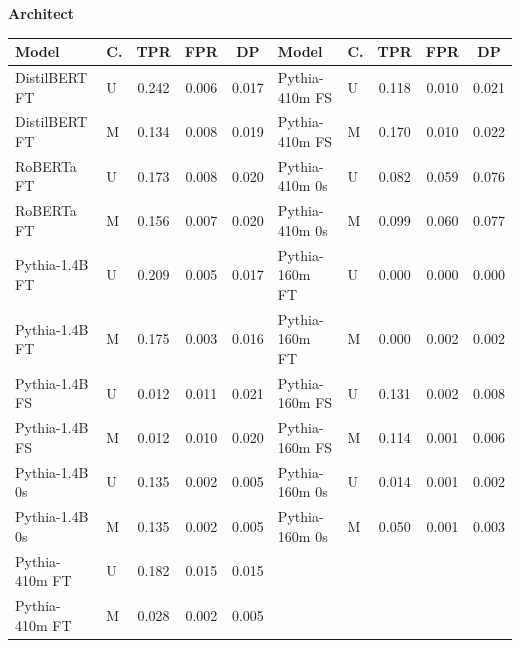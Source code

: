 \documentclass[11pt]{article}
\begin{document}
\vspace{4pt}\noindent\textbf{Architect}
\begin{center}\scriptsize
\begin{tabular}{llccc|llccc}
\toprule
\textbf{Model} & \textbf{C.} & \textbf{TPR} & \textbf{FPR} & \textbf{DP} & \textbf{Model} & \textbf{C.} & \textbf{TPR} & \textbf{FPR} & \textbf{DP} \\
\midrule
DistilBERT FT & U & 0.242 & 0.006 & 0.017 & Pythia-410m FS & U & 0.118 & 0.010 & 0.021 \\
DistilBERT FT & M & 0.134 & 0.008 & 0.019 & Pythia-410m FS & M & 0.170 & 0.010 & 0.022 \\
RoBERTa FT & U & 0.173 & 0.008 & 0.020 & Pythia-410m 0s & U & 0.082 & 0.059 & 0.076 \\
RoBERTa FT & M & 0.156 & 0.007 & 0.020 & Pythia-410m 0s & M & 0.099 & 0.060 & 0.077 \\
Pythia-1.4B FT & U & 0.209 & 0.005 & 0.017 & Pythia-160m FT & U & 0.000 & 0.000 & 0.000 \\
Pythia-1.4B FT & M & 0.175 & 0.003 & 0.016 & Pythia-160m FT & M & 0.000 & 0.002 & 0.002 \\
Pythia-1.4B FS & U & 0.012 & 0.011 & 0.021 & Pythia-160m FS & U & 0.131 & 0.002 & 0.008 \\
Pythia-1.4B FS & M & 0.012 & 0.010 & 0.020 & Pythia-160m FS & M & 0.114 & 0.001 & 0.006 \\
Pythia-1.4B 0s & U & 0.135 & 0.002 & 0.005 & Pythia-160m 0s & U & 0.014 & 0.001 & 0.002 \\
Pythia-1.4B 0s & M & 0.135 & 0.002 & 0.005 & Pythia-160m 0s & M & 0.050 & 0.001 & 0.003 \\
Pythia-410m FT & U & 0.182 & 0.015 & 0.015 & & & & & \\
Pythia-410m FT & M & 0.028 & 0.002 & 0.005 & & & & & \\
\bottomrule
\end{tabular}
\end{center}
\end{document}
